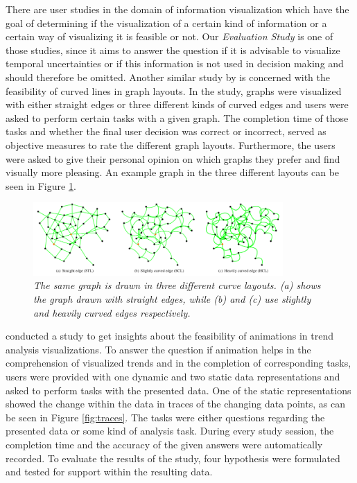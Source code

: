 There are user studies in the domain of information visualization which have the goal of determining if the visualization of a certain kind of information or a certain way of visualizing it is feasible or not. Our \textit{Evaluation Study} is one of those studies, since it aims to answer the question if it is advisable to visualize temporal uncertainties or if this information is not used in decision making and should therefore be omitted. Another similar study by \citet{xu2012user} is concerned with the feasibility of curved lines in graph layouts. In the study, graphs were visualized with either straight edges or three different kinds of curved edges and users were asked to perform certain tasks with a given graph. The completion time of those tasks and whether the final user decision was correct or incorrect, served as objective measures to rate the different graph layouts. Furthermore, the users were asked to give their personal opinion on which graphs they prefer and find visually more pleasing. An example graph in the three different layouts can be seen in Figure \ref{fig:graphs}. \par \medskip

\begin{figure}[H]
	\centering
	\includegraphics[width=0.85\textwidth]{figures/graphs.png}
	\caption{\textit{The same graph is drawn in three different curve layouts. (a) shows the graph drawn with straight edges, while (b) and (c) use slightly and heavily curved edges respectively. \cite{xu2012user}}}
	\label{fig:graphs}
\end{figure}

\citet{robertson2008effectiveness} conducted a study to get insights about the feasibility of animations in trend analysis visualizations. To answer the question if animation helps in the comprehension of visualized trends and in the completion of corresponding tasks, users were provided with one dynamic and two static data representations and asked to perform tasks with the presented data. One of the static representations showed the change within the data in traces of the changing data points, as can be seen in Figure \ref{fig:traces}. The tasks were either questions regarding the presented data or some kind of analysis task. During every study session, the completion time and the accuracy of the given answers were automatically recorded. To evaluate the results of the study, four hypothesis were formulated and tested for support within the resulting data. \par \medskip


